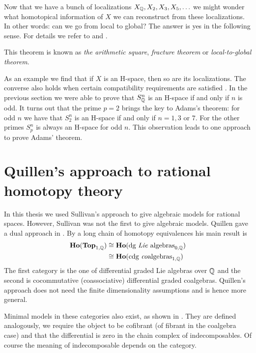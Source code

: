Now that we have a bunch of localizations $X_{\mathbb{Q}}, X_2, X_3, X_5, \ldots$ we might wonder what homotopical information of $X$ we can reconstruct from these localizations. In other words: can we go from local to global? The answer is yes in the following sense. For details we refer to \cite{may2} and \cite{sullivan}.

This theorem is known as \emph{the arithmetic square}, \emph{fracture theorem} or \emph{local-to-global theorem}.

As an example we find that if $X$ is an H-space, then so are its localizations. The converse also holds when certain compatibility requirements are satisfied \cite{sullivan}. In the previous section we were able to prove that $S^n_{\mathbb{Q}}$ is an H-space if and only if $n$ is odd. It turns out that the prime $p=2$ brings the key to Adams's theorem: for odd $n$ we have that $S^n_2$ is an H-space if and only if $n=1, 3$ or $7$. For the other primes $S^n_p$ is always an H-space for odd $n$. This observation leads to one approach to prove Adams' theorem.


\section{Quillen's approach to rational homotopy theory}
In this thesis we used Sullivan's approach to give algebraic models for rational spaces. However, Sullivan was not the first to give algebraic models. Quillen gave a dual approach in \cite{quillen}. By a long chain of homotopy equivalences his main result is
\begin{align*}
	\mathbf{Ho}(\mathbf{Top}_{1, \mathbb{Q}}) &\cong \mathbf{Ho}(\text{dg \emph{Lie} algebras}_{0, \mathbb{Q}}) \\
		&\cong \mathbf{Ho}(\text{cdg \emph{co}algebras}_{1, \mathbb{Q}})
\end{align*}
The first category is the one of differential graded Lie algebras over $\mathbb{Q}$ and the second is cocommutative (coassociative) differential graded coalgebras. Quillen's approach does not need the finite dimensionality assumptions and is hence more general.

Minimal models in these categories also exist, as shown in \cite{neisendorfer}. They are defined analogously, we require the object to be cofibrant (of fibrant in the coalgebra case) and that the differential is zero in the chain complex of indecomposables. Of course the meaning of indecomposable depends on the category.

